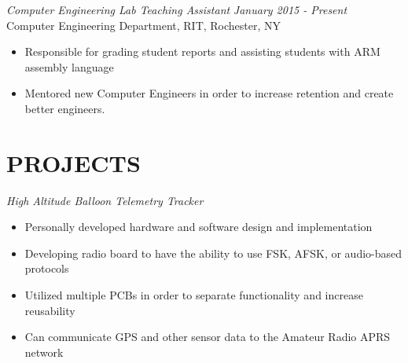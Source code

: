 \documentclass[line,margin]{res}
\begin{document}
\begin{resume}

	\vspace{-5pt}
{\sl Computer Engineering Lab Teaching Assistant } \hfill {\sl January 2015 - Present} \\
	Computer Engineering Department, RIT, Rochester, NY
	\begin{itemize}  \itemsep -2pt %
		\item Responsible for grading student reports and assisting students with ARM assembly language 
		\item Mentored new Computer Engineers in order to increase retention and create better engineers.
	\end{itemize} 



\section{PROJECTS}
	{\sl High Altitude Balloon Telemetry Tracker }
		\begin{itemize} \itemsep -2pt
			\item Personally developed hardware and software design and implementation
			\item Developing radio board to have the ability to use FSK, AFSK, or audio-based protocols
			\item Utilized multiple PCBs in order to separate functionality and increase reusability
			\item Can communicate GPS and other sensor data to the Amateur Radio APRS network
		\end{itemize}

			

\end{resume}
\end{document}
